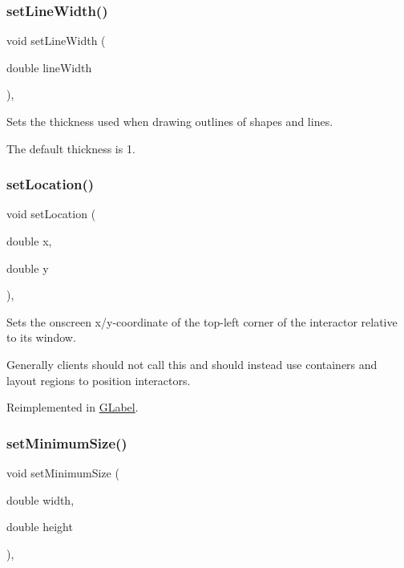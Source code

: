 \subsubsection{\texorpdfstring{set\+Line\+Width()}{setLineWidth()}}
{\footnotesize\ttfamily void set\+Line\+Width (\begin{DoxyParamCaption}\item[{double}]{line\+Width }\end{DoxyParamCaption})\hspace{0.3cm}{\ttfamily [virtual]}, {\ttfamily [inherited]}}



Sets the thickness used when drawing outlines of shapes and lines. 

The default thickness is 1. \mbox{\label{classsgl_1_1GInteractor_a04594e8ba9b98513a64f1da00dcae18c}} 
\subsubsection{\texorpdfstring{set\+Location()}{setLocation()}}
{\footnotesize\ttfamily void set\+Location (\begin{DoxyParamCaption}\item[{double}]{x,  }\item[{double}]{y }\end{DoxyParamCaption})\hspace{0.3cm}{\ttfamily [virtual]}, {\ttfamily [inherited]}}



Sets the onscreen x/y-\/coordinate of the top-\/left corner of the interactor relative to its window. 

Generally clients should not call this and should instead use containers and layout regions to position interactors. 

Reimplemented in \mbox{\hyperlink{classsgl_1_1GLabel_ae3b17c0aeb355dc23c4e4cbf066e81f7}{G\+Label}}.

\mbox{\label{classsgl_1_1GInteractor_a0cf428e207b7f22cc08138a90b1b87b2}} 
\subsubsection{\texorpdfstring{set\+Minimum\+Size()}{setMinimumSize()}\hspace{0.1cm}{\footnotesize\ttfamily [1/2]}}
{\footnotesize\ttfamily void set\+Minimum\+Size (\begin{DoxyParamCaption}\item[{double}]{width,  }\item[{double}]{height }\end{DoxyParamCaption})\hspace{0.3cm}{\ttfamily [virtual]}, {\ttfamily [inherited]}}



